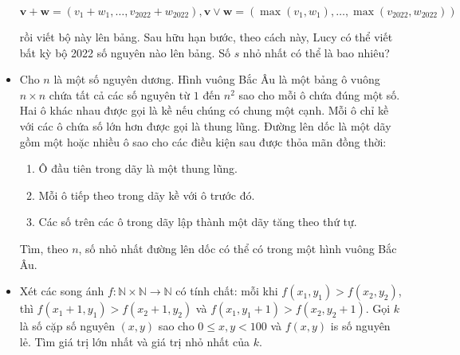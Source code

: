 \documentclass[11pt]{scrartcl}
\begin{document}
\begin{itemize}[label=, leftmargin=0em, itemsep=-0em]
\begin{btvn}
            \[\mathbf{v}+\mathbf{w}=(v_1+w_1,\ldots,v_{2022}+w_{2022}),
            \mathbf{v} \lor \mathbf{w}=(\max(v_1,w_1),\ldots,\max(v_{2022},w_{2022}))\]

            rồi viết bộ này lên bảng. Sau hữu hạn bước, theo cách này, Lucy có thể viết bất kỳ bộ 2022 số nguyên nào lên bảng. Số $s$ nhỏ nhất có thể là bao nhiêu?
    \end{btvn}

    \item \begin{btvn} Cho $n$ là một số nguyên dương. Hình vuông Bắc Âu là một bảng ô vuông $n \times n$ chứa tất cả các số nguyên từ $1$ đến $n^2$ sao cho mỗi ô chứa đúng một số. Hai ô khác nhau được gọi là kề nếu chúng có chung một cạnh. Mỗi ô chỉ kề với các ô chứa số lớn hơn được gọi là thung lũng. Đường lên dốc là một dãy gồm một hoặc nhiều ô sao cho các điều kiện sau được thỏa mãn đồng thời:
    \begin{enumerate}
        \item Ô đầu tiên trong dãy là một thung lũng.
        \item Mỗi ô tiếp theo trong dãy kề với ô trước đó.
        \item Các số trên các ô trong dãy lập thành một dãy tăng theo thứ tự.
    \end{enumerate}
    Tìm, theo $n$, số nhỏ nhất đường lên dốc có thể có trong một hình vuông Bắc Âu.
    \end{btvn}

    \item \begin{btvn}
        Xét các song ánh $f:\mathbb N\times \mathbb N \to \mathbb N$ có tính chất: mỗi khi $f(x_1,y_1) > f(x_2, y_2)$, thì $f(x_1+1, y_1) > f(x_2 + 1, y_2)$ và $f(x_1, y_1+1) > f(x_2, y_2+1)$. Gọi $k$ là số cặp số nguyên $(x,y)$ sao cho $0\le x,y<100$ và $f(x,y)$ is số nguyên lẻ. Tìm giá trị lớn nhất và giá trị nhỏ nhất của $k$.
    \end{btvn}


\end{itemize}
\end{document}
